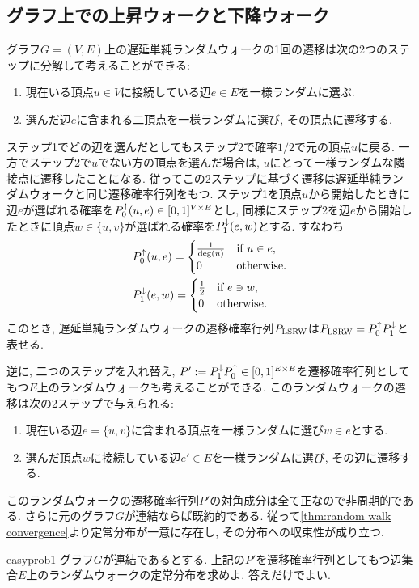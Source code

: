 \subsection{グラフ上での上昇ウォークと下降ウォーク} \label{sec:graph up and down walk}
グラフ$G=(V,E)$上の遅延単純ランダムウォークの1回の遷移は次の2つのステップに分解して考えることができる:
\begin{enumerate}
  \item 現在いる頂点$u\in V$に接続している辺$e \in E$を一様ランダムに選ぶ.
  \item 選んだ辺$e$に含まれる二頂点を一様ランダムに選び, その頂点に遷移する.
\end{enumerate}
ステップ1でどの辺を選んだとしてもステップ2で確率$1/2$で元の頂点$u$に戻る.
一方でステップ2で$u$でない方の頂点を選んだ場合は, $u$にとって一様ランダムな隣接点に遷移したことになる.
従ってこの2ステップに基づく遷移は遅延単純ランダムウォークと同じ遷移確率行列をもつ.
ステップ1を頂点$u$から開始したときに辺$e$が選ばれる確率を$P^{\uparrow}_0(u,e) \in [0,1]^{V \times E}$とし,
同様にステップ2を辺$e$から開始したときに頂点$w \in \{u,v\}$が選ばれる確率を$P^{\downarrow}_1(e,w)$とする.
すなわち
\begin{align*}
   & P^{\uparrow}_0(u,e) = \begin{cases}
                     \frac{1}{\deg(u)} & \text{if }u \in e, \\
                     0                 & \text{otherwise}.
                   \end{cases} \\
   & P^{\downarrow}_1(e,w) = \begin{cases}
                       \frac{1}{2} & \text{if }e \ni w, \\
                       0           & \text{otherwise}.
                     \end{cases}
\end{align*}
このとき, 遅延単純ランダムウォークの遷移確率行列$P_{\mathrm{LSRW}}$は$P_{\mathrm{LSRW}} = P^{\uparrow}_0 P^{\downarrow}_1$と表せる.

逆に, 二つのステップを入れ替え, $P'\mathrel{:=} P^{\downarrow}_1 P^{\uparrow}_0 \in [0,1]^{E\times E}$を遷移確率行列としてもつ$E$上のランダムウォークも考えることができる.
このランダムウォークの遷移は次の2ステップで与えられる:
\begin{enumerate}
  \item 現在いる辺$e = \{u,v\}$に含まれる頂点を一様ランダムに選び$w \in e$とする.
  \item 選んだ頂点$w$に接続している辺$e'\in E$を一様ランダムに選び, その辺に遷移する.
\end{enumerate}
このランダムウォークの遷移確率行列$P'$の対角成分は全て正なので非周期的である.
さらに元のグラフ$G$が連結ならば既約的である.
従って\cref{thm:random walk convergence}より定常分布が一意に存在し, その分布への収束性が成り立つ.
%
\begin{exercise}{easy}{prob1}
  グラフ$G$が連結であるとする.
  上記の$P'$を遷移確率行列としてもつ辺集合$E$上のランダムウォークの定常分布を求めよ.
  答えだけでよい.
\end{exercise}
%

